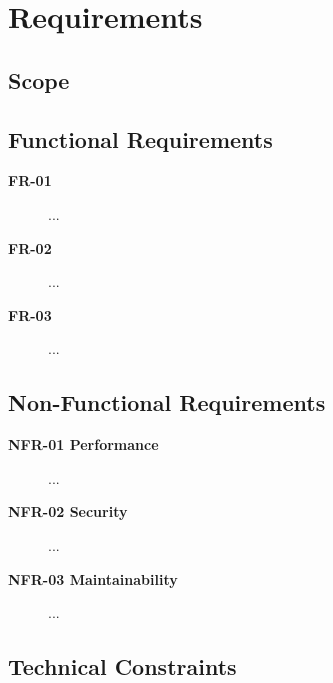 \section{Requirements}
\label{sec:requirements}


\subsection{Scope}

\subsection{Functional Requirements}

\begin{description}
  \item[\textbf{FR-01}] ...
  \item[\textbf{FR-02}] ...
  \item[\textbf{FR-03}] ...
\end{description}

\subsection{Non-Functional Requirements}

\begin{description}
  \item[\textbf{NFR-01 Performance}] ...
  \item[\textbf{NFR-02 Security}] ...
  \item[\textbf{NFR-03 Maintainability}] ...
\end{description}

\subsection{Technical Constraints}
